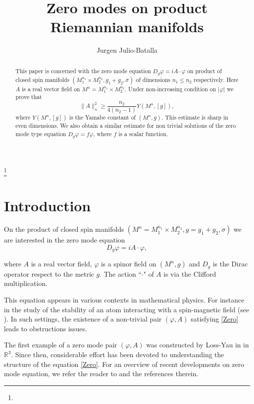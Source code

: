 \documentclass[11pt]{amsart}
\theoremstyle{plain}
\numberwithin{equation}{section}
\theoremstyle{plain}
\begin{document}
\title[]{Zero modes on product Riemannian manifolds}

\author{Jurgen Julio-Batalla}
\address{ Universidad Industrial de Santander, Carrera 27 calle 9, 680002, Bucaramanga, Santander, Colombia}
\thanks{ }

\begin{abstract} 
This paper is concerned with the zero mode equation $D_g\varphi=iA\cdot\varphi$ on product of closed spin manifolds $(M_1^{n_1}\times M_2^{n_2},g_1+g_2,\sigma)$ of dimensions $n_1\leq n_2$ respectively. Here $A$ is a real vector field on $M^n=M_1^{n_1}\times M_2^{n_2}$. Under non-increasing condition on $|\varphi|$ we prove that $$\parallel A\parallel_n^2\geq\frac{n_2}{4(n_2-1)}Y(M^n,[g]),$$ where $Y(M^n,[g])$ is the Yamabe constant of $(M^n,g)$. This estimate is sharp in even dimensions. We also obtain a similar estimate for non trivial solutions of the zero mode type equation $D_g\varphi=f\varphi$, where $f$ is a scalar function.
 
\end{abstract}

\maketitle


\section{Introduction}
On the product of closed spin manifolds $(M^n=M_1^{n_1}\times M_2^{n_2},g=g_1+g_2,\sigma)$ we are interested in the zero mode equation
\begin{equation}\label{Zero}
D_g\varphi=iA\cdot\varphi,
\end{equation}



where $A$ is a real vector field, $\varphi$ is a spinor field on $(M^n,g)$ and $D_g$ is the Dirac operator respect to the metric $g$. The action ``$\cdot$" of $A$ is via the Clifford multiplication.

This equation appears in various contexts in mathematical physics. For instance in the study of the stability of an atom interacting with a spin-magnetic field (see \cite{Frohlich}). In such settings, the existence of a  non-trivial pair $(\varphi,A)$ satisfying \eqref{Zero} leads to obstructions issues.

The first example of a zero mode pair $(\varphi,A)$ was constructed by Loss-Yau in \cite{Loss-Yau} in $\mathbb{R}^3$. Since then, considerable effort has been devoted to understanding the structure of the equation \eqref{Zero}. For an overview of recent developments on zero mode equation, we refer the reader to   \cite{Frank-Loss1} and the references therein.
\end{document}
